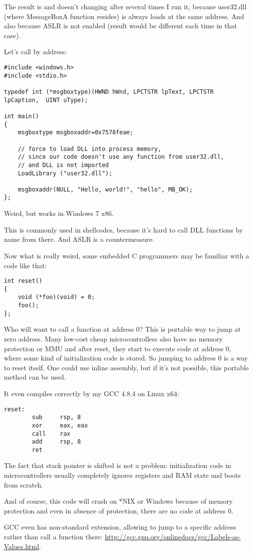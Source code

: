The result is  and doesn't changing after several times I run it,
because user32.dll (where MessageBoxA function resides) is always loads at the same address.
And also because \ac{ASLR} is not enabled (result would be different each time in that case).

Let's call  by address:

\begin{lstlisting}[style=customc]
#include <windows.h>
#include <stdio.h>

typedef int (*msgboxtype)(HWND hWnd, LPCTSTR lpText, LPCTSTR lpCaption,  UINT uType);

int main()
{
	msgboxtype msgboxaddr=0x7578feae;

	// force to load DLL into process memory, 
	// since our code doesn't use any function from user32.dll, 
	// and DLL is not imported
	LoadLibrary ("user32.dll");

	msgboxaddr(NULL, "Hello, world!", "hello", MB_OK);
};
\end{lstlisting}

Weird, but works in Windows 7 x86.

This is commonly used in shellcodes, because it's hard to call DLL functions by name from there.
And \ac{ASLR} is a countermeasure.

Now what is really weird, some embedded C programmers may be familiar with a code like that:

\begin{lstlisting}[style=customc]
int reset()
{
	void (*foo)(void) = 0;
	foo();
};
\end{lstlisting}

Who will want to call a function at address 0?
This is portable way to jump at zero address.
Many low-cost cheap microcontrollers also have no memory protection or \ac{MMU} and after reset, they start to execute code at address 0, where some kind of initialization code is stored.
So jumping to address 0 is a way to reset itself.
One could use inline assembly, but if it's not possible, this portable method can be used.

It even compiles correctly by my GCC 4.8.4 on Linux x64:

\begin{lstlisting}[style=customasmx86]
reset:
        sub     rsp, 8
        xor     eax, eax
        call    rax
        add     rsp, 8
        ret
\end{lstlisting}

The fact that stack pointer is shifted is not a problem: initialization code in microcontrollers usually completely ignores registers and \ac{RAM} state and boots from scratch.

And of course, this code will crash on *NIX or Windows because of memory protection and even in absence of protection, there are no code at address 0.

GCC even has non-standard extension, allowing to jump to a specific address rather than call a function there:
\url{http://gcc.gnu.org/onlinedocs/gcc/Labels-as-Values.html}.

